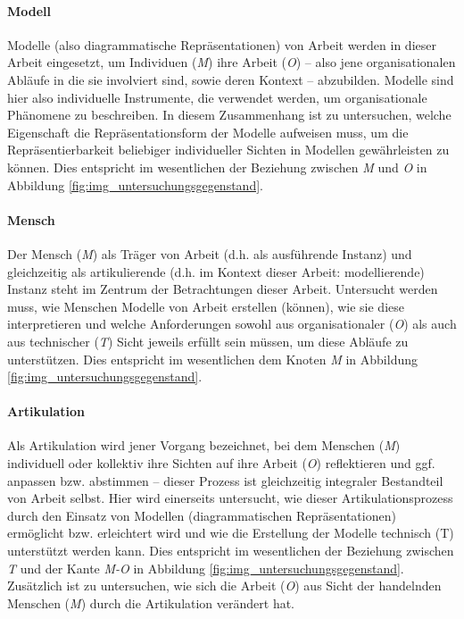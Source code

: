 \paragraph{Modell} %
\label{par:modell}

Modelle (also diagrammatische Repräsentationen) von Arbeit werden in dieser Arbeit eingesetzt, um Individuen (\emph{M}) ihre Arbeit (\emph{O}) -- also jene organisationalen Abläufe in die sie involviert sind, sowie deren Kontext -- abzubilden. Modelle sind hier also individuelle Instrumente, die verwendet werden, um organisationale Phänomene zu beschreiben. In diesem Zusammenhang ist zu untersuchen, welche Eigenschaft die Repräsentationsform der Modelle aufweisen muss, um die Repräsentierbarkeit beliebiger individueller Sichten in Modellen gewährleisten zu können. Dies entspricht im wesentlichen der Beziehung zwischen \emph{M} und \emph{O} in Abbildung \ref{fig:img_untersuchungsgegenstand}.

\paragraph{Mensch} %
\label{par:mensch}

Der Mensch (\emph{M}) als Träger von Arbeit (d.h. als ausführende Instanz) und gleichzeitig als artikulierende (d.h. im Kontext dieser Arbeit: modellierende) Instanz steht im Zentrum der Betrachtungen dieser Arbeit. Untersucht werden muss, wie Menschen Modelle von Arbeit erstellen (können), wie sie diese interpretieren und welche Anforderungen sowohl aus organisationaler (\emph{O}) als auch aus technischer (\emph{T}) Sicht jeweils erfüllt sein müssen, um diese Abläufe zu unterstützen. Dies entspricht im wesentlichen dem Knoten \emph{M} in Abbildung \ref{fig:img_untersuchungsgegenstand}.


\paragraph{Artikulation} %
\label{par:artikulation}

Als Artikulation wird jener Vorgang bezeichnet, bei dem Menschen (\emph{M}) individuell oder kollektiv ihre Sichten auf ihre Arbeit (\emph{O}) reflektieren und ggf. anpassen bzw. abstimmen -- dieser Prozess ist gleichzeitig integraler Bestandteil von Arbeit selbst. Hier wird einerseits untersucht, wie dieser Artikulationsprozess durch den Einsatz von Modellen (diagrammatischen Repräsentationen) ermöglicht bzw. erleichtert wird und wie die Erstellung der Modelle technisch (T) unterstützt werden kann. Dies entspricht im wesentlichen der Beziehung zwischen \emph{T} und der Kante \emph{M-O} in Abbildung \ref{fig:img_untersuchungsgegenstand}. Zusätzlich ist zu untersuchen, wie sich die Arbeit (\emph{O}) aus Sicht der handelnden Menschen (\emph{M}) durch die Artikulation verändert hat.

